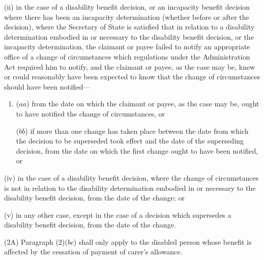 \documentclass[12pt,a4paper]{article}
\begin{document}
\begin{enumerate}
\begin{enumerate}

(ii) in the case of a disability benefit decision, or an incapacity benefit decision where there has been an incapacity determination (whether before or after the decision), where the Secretary of State is satisfied that in relation to a disability determination embodied in or necessary to the disability benefit decision, or the incapacity determination, the claimant or payee failed to notify an appropriate office of a change of circumstances which regulations under the Administration Act required him to notify, and the claimant or payee, as the case may be, knew or could reasonably have been expected to know that the change of circumstances should have been notified---
\begin{enumerate}\item[]
($aa$) from the date on which the claimant or payee, as the case may be, ought to have notified the change of circumstances, or

($bb$) if more than one change has taken place between the date from which the decision to be superseded took effect and the date of the superseding decision, from the date on which the first change ought to have been notified, or
\end{enumerate}


(iv) in the case of a disability benefit decision, where the change of circumstances is not in relation to the disability determination embodied in or necessary to the disability benefit decision, from the date of the change; or

(v) in any other case, except in the case of a decision which supersedes a disability benefit decision, from the date of the change.
\end{enumerate}
\end{enumerate}

(2A) Paragraph (2)($bc$)  shall only apply to the disabled person whose benefit is affected by the cessation of payment of carer’s allowance.
\end{document}
